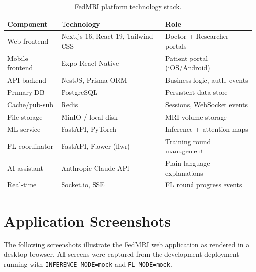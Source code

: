 \begin{table}[htbp]
  \centering
  \caption{FedMRI platform technology stack.}
  \label{tab:tech-stack}
  \renewcommand{\arraystretch}{1.3}
  \begin{tabular}{lll}
    \toprule
    \textbf{Component} & \textbf{Technology}
      & \textbf{Role} \\
    \midrule
    Web frontend    & Next.js 16, React 19, Tailwind CSS
      & Doctor + Researcher portals \\
    Mobile frontend & Expo React Native
      & Patient portal (iOS/Android) \\
    API backend     & NestJS, Prisma ORM
      & Business logic, auth, events \\
    Primary DB      & PostgreSQL
      & Persistent data store \\
    Cache/pub-sub   & Redis
      & Sessions, WebSocket events \\
    File storage    & MinIO / local disk
      & MRI volume storage \\
    ML service      & FastAPI, PyTorch
      & Inference + attention maps \\
    FL coordinator  & FastAPI, Flower (flwr)
      & Training round management \\
    AI assistant    & Anthropic Claude API
      & Plain-language explanations \\
    Real-time       & Socket.io, SSE
      & FL round progress events \\
    \bottomrule
  \end{tabular}
\end{table}


\section{Application Screenshots}
\label{app:screenshots}

The following screenshots illustrate the FedMRI web application
as rendered in a desktop browser.
All screens were captured from the development deployment
running with \texttt{INFERENCE\_MODE=mock} and
\texttt{FL\_MODE=mock}.


